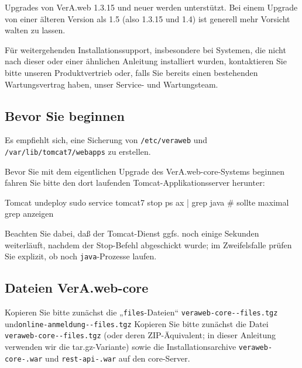 \ifvwconfigsinetcalready\else%
Upgrades von VerA.web 1.3.15 und neuer werden unterstützt. Bei einem
Upgrade von einer älteren Version als 1.5 (also 1.3.15 und 1.4) ist
generell mehr Vorsicht walten zu lassen.
\fi%

Für weitergehenden Installationssupport, insbesondere bei Systemen,
die nicht nach dieser oder einer ähnlichen Anleitung installiert
wurden, kontaktieren Sie bitte unseren Produktvertrieb oder, falls
Sie bereits einen bestehenden Wartungsvertrag haben, unser Service-
und Wartungsteam.

\subsection{Bevor Sie beginnen}\label{subsec:upgrade-core-pre}

Es empfiehlt sich, eine Sicherung von \texttt{/etc/veraweb} und
\texttt{/var/lib/tomcat7/webapps} zu erstellen.

\begin{minipage}{\textwidth}
Bevor Sie mit dem eigentlichen Upgrade des VerA.web-core-Systems beginnen
fahren Sie bitte den dort laufenden Tomcat-Applikationsserver herunter:

\begin{lstdump}{Tomcat undeploy}
sudo service tomcat7 stop
ps ax | grep java # sollte maximal grep anzeigen
\end{lstdump}

Beachten Sie dabei, daß der Tomcat-Dienst ggfs. noch einige Sekunden
weiterläuft, nachdem der Stop-Befehl abgeschickt wurde; im Zweifelsfalle
prüfen Sie explizit, ob noch \texttt{java}-Prozesse laufen.
\end{minipage}

\subsection{Dateien VerA.web-core}\label{subsec:upgrade-core-files}

\ifoa
Kopieren Sie bitte zunächst die „\texttt{files}-Dateien“
\texttt{veraweb-core-\vwiaverssw{}-files.tgz} und\linebreak[1]
\texttt{online-anmeldung-\vwiaverssw{}-files.tgz}
\else%
Kopieren Sie bitte zunächst die Datei
\texttt{veraweb-core-\vwiaverssw{}-files.tgz}
\fi%
(oder deren ZIP-Äquivalent; in dieser Anleitung verwenden
wir die tar.gz-Variante) sowie die Installationsarchive
\texttt{veraweb-core-\vwiaverssw{}.war}
und \texttt{rest-api-\vwiaverssw{}.war} auf den core-Server.

